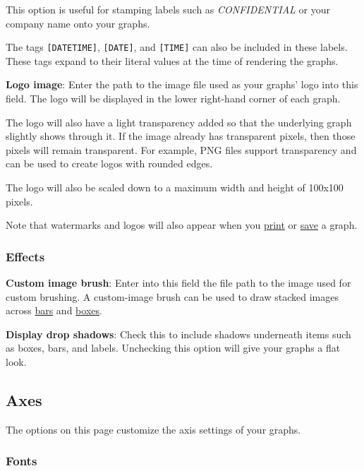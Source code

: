 \documentclass[
]{book}
\theoremstyle{definition}
\theoremstyle{definition}
\theoremstyle{definition}
\theoremstyle{definition}
\theoremstyle{remark}
\begin{document}
This option is useful for stamping labels such as \emph{CONFIDENTIAL} or your company name onto your graphs.

The tags \texttt{{[}DATETIME{]}}, \texttt{{[}DATE{]}}, and \texttt{{[}TIME{]}} can also be included in these labels. These tags expand to their literal values at the time of rendering the graphs.

\textbf{Logo image}: Enter the path to the image file used as your graphs' logo into this field. The logo will be displayed in the lower right-hand corner of each graph.

The logo will also have a light transparency added so that the underlying graph slightly shows through it. If the image already has transparent pixels, then those pixels will remain transparent. For example, PNG files support transparency and can be used to create logos with rounded edges.

The logo will also be scaled down to a maximum width and height of 100x100 pixels.

Note that watermarks and logos will also appear when you \protect\hyperlink{printing}{print} or \protect\hyperlink{exporting}{save} a graph.

\hypertarget{effects}{%
\subsubsection*{Effects}\label{effects}}

\textbf{Custom image brush}: Enter into this field the file path to the image used for custom brushing. A custom-image brush can be used to draw stacked images across \protect\hyperlink{options-bar-charts}{bars} and \protect\hyperlink{options-box-plots}{boxes}.

\textbf{Display drop shadows}: Check this to include shadows underneath items such as boxes, bars, and labels. Unchecking this option will give your graphs a flat look.

\hypertarget{axes}{%
\subsection*{Axes}\label{axes}}

The options on this page customize the axis settings of your graphs.

\hypertarget{fonts}{%
\subsubsection*{Fonts}\label{fonts}}
\end{document}
